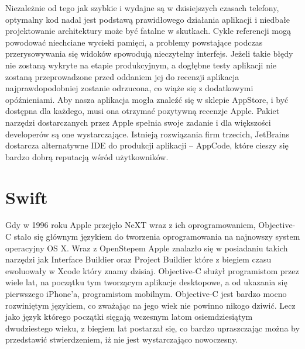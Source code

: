 Niezależnie od tego jak szybkie i wydajne są w dzisiejszych czasach telefony, optymalny kod nadal jest podstawą prawidłowego działania aplikacji i niedbałe projektowanie architektury może być fatalne w skutkach. Cykle referencji mogą powodować niechciane wycieki pamięci, a problemy powstające podczas przerysowywania się widoków spowodują nieczytelny interfejs. Jeżeli takie błędy nie zostaną wykryte na etapie produkcyjnym, a dogłębne testy aplikacji nie zostaną przeprowadzone przed oddaniem jej do recenzji aplikacja najprawdopodobniej zostanie odrzucona, co wiąże się z dodatkowymi opóźnieniami. Aby nasza aplikacja mogła znaleźć się w sklepie AppStore, i być dostępna dla każdego, musi ona otrzymać pozytywną recenzje Apple. Pakiet narzędzi dostarczanych przez Apple spełnia swoje zadanie i dla większości developerów są one wystarczające. Istnieją rozwiązania firm trzecich, JetBrains dostarcza alternatywne IDE do produkcji aplikacji -- AppCode, które cieszy się bardzo dobrą reputacją wśród użytkowników.

\section{Swift}

Gdy w 1996 roku Apple przejęło NeXT wraz z ich oprogramowaniem, Objective-C stało się głównym językiem do tworzenia oprogramowania na najnowszy system operacyjny OS X. Wraz z OpenStepem Apple znalazło się w posiadaniu takich narzędzi jak Interface Buildier oraz Project Buildier które z biegiem czasu ewoluowały w Xcode który znamy dzisiaj. Objective-C służył programistom przez wiele lat, na początku tym tworzącym aplikacje desktopowe, a od ukazania się pierwszego iPhone'a, programistom mobilnym. Objective-C jest bardzo mocno rozwiniętym językiem, co zważając na jego wiek nie powinno nikogo dziwić. Lecz jako język którego początki sięgają wczesnym latom osiemdziesiątym dwudziestego wieku, z biegiem lat postarzał się, co bardzo upraszczając można by przedstawić stwierdzeniem, iż nie jest wystarczająco nowoczesny.

